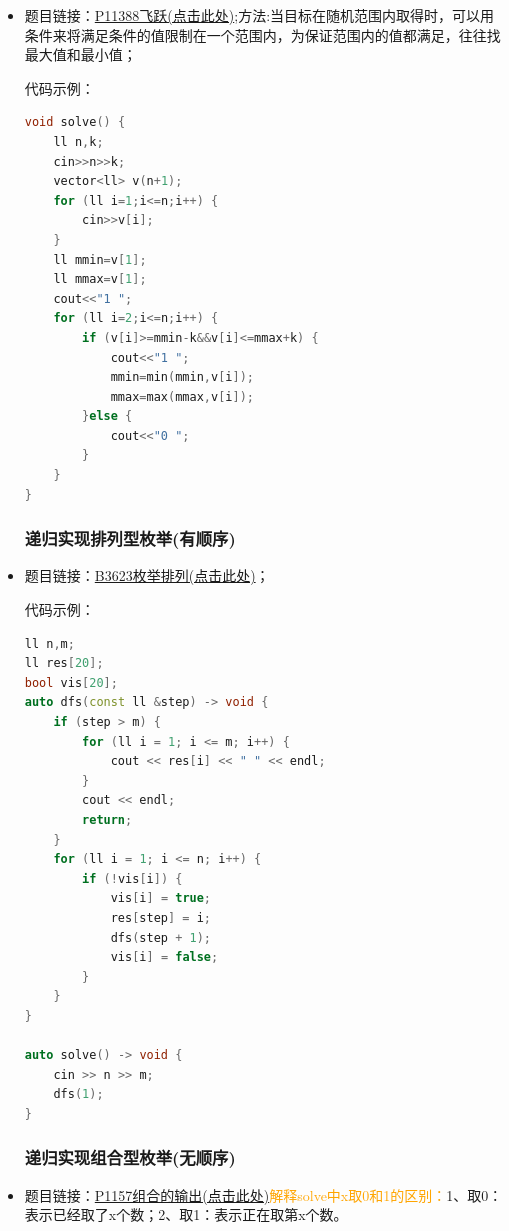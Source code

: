 \begin{itemize}
\subsection{深度优先搜索}
\subsubsection{P11388飞跃}
\item 题目链接：\href{https://www.luogu.com.cn/problem/P11388}{P11388飞跃(点击此处)};方法:当目标在随机范围内取得时，可以用条件来将满足条件的值限制在一个范围内，为保证范围内的值都满足，往往找最大值和最小值；						
	
代码示例：\\
\begin{lstlisting}[language=C++]
void solve() {
	ll n,k;
	cin>>n>>k;
	vector<ll> v(n+1);
	for (ll i=1;i<=n;i++) {
		cin>>v[i];
	}
	ll mmin=v[1];
	ll mmax=v[1];
	cout<<"1 ";
	for (ll i=2;i<=n;i++) {
		if (v[i]>=mmin-k&&v[i]<=mmax+k) {
			cout<<"1 ";
			mmin=min(mmin,v[i]);
			mmax=max(mmax,v[i]);
		}else {
			cout<<"0 ";
		}
	}
}
\end{lstlisting}
\subsubsection{递归实现排列型枚举(有顺序)}
\item 题目链接：\href{https://www.luogu.com.cn/problem/B3623}{B3623枚举排列(点击此处)}；

代码示例：\\
\begin{lstlisting}[language=C++]
ll n,m;	
ll res[20];
bool vis[20];
auto dfs(const ll &step) -> void {
	if (step > m) {
		for (ll i = 1; i <= m; i++) {
			cout << res[i] << " " << endl;
		}
		cout << endl;
		return;
	}
	for (ll i = 1; i <= n; i++) {
		if (!vis[i]) {
			vis[i] = true;
			res[step] = i;
			dfs(step + 1);
			vis[i] = false;
		}
	}
}

auto solve() -> void {
	cin >> n >> m;
	dfs(1);
}
\end{lstlisting}
\subsubsection{递归实现组合型枚举(无顺序)}
\item 题目链接：\href{https://www.luogu.com.cn/problem/P1157}{P1157组合的输出(点击此处)}\textcolor{orange}{解释solve中x取0和1的区别：}1、取0：表示已经取了x个数；2、取1：表示正在取第x个数。


\end{itemize}
